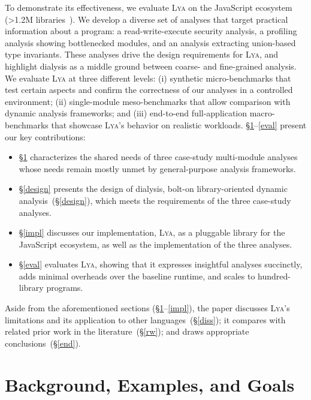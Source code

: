 \documentclass[letterpaper,twocolumn,10pt]{article}
\newcommand{\sx}[1]{(\S\ref{#1})}
\newcommand{\sys}{{\scshape Lya}\xspace}
\begin{document}
To demonstrate its effectiveness, we evaluate \sys on the JavaScript ecosystem (>1.2M libraries~\cite{modulecounts}). %
We develop a diverse set of analyses that target practical information about a program:
  a read-write-execute security analysis,
  a profiling analysis showing bottlenecked modules,
  and an analysis extracting union-based type invariants.
These analyses drive the design requirements for \sys, and highlight dialysis as a middle ground between coarse- and fine-grained analysis.
We evaluate \sys at three different levels:
  (i) synthetic micro-benchmarks that test certain aspects and confirm the correctness of our analyses in a controlled environment;
  (ii) single-module meso-benchmarks that allow comparison with dynamic analysis frameworks; and
  (iii) end-to-end full-application macro-benchmarks that showcase \sys's behavior on realistic workloads. 
\S\ref{bg}--\ref{eval} present our key contributions:
\begin{itemize}
\item \S\ref{bg} characterizes the shared needs of three case-study multi-module analyses whose needs remain mostly unmet by general-purpose analysis frameworks.
\item \S\ref{design} presents the design of dialysis, bolt-on library-oriented dynamic analysis~\sx{design}, which meets the requirements of the three case-study analyses.
\item \S\ref{impl} discusses our implementation, \sys, as a pluggable library for the JavaScript ecosystem, as well as the implementation of the three analyses.
\item \S\ref{eval} evaluates \sys, showing that it expresses insightful analyses succinctly, adds minimal overheads over the baseline runtime, and scales to hundred-library programs.
\end{itemize}

Aside from the aforementioned sections (\S\ref{bg}--\ref{impl}), the paper discusses \sys's limitations and its application to other languages~\sx{diss};
  it compares with related prior work in the literature~\sx{rw};
  and draws appropriate conclusions~\sx{end}.


\section{Background, Examples, and Goals}
\label{bg}
\end{document}
